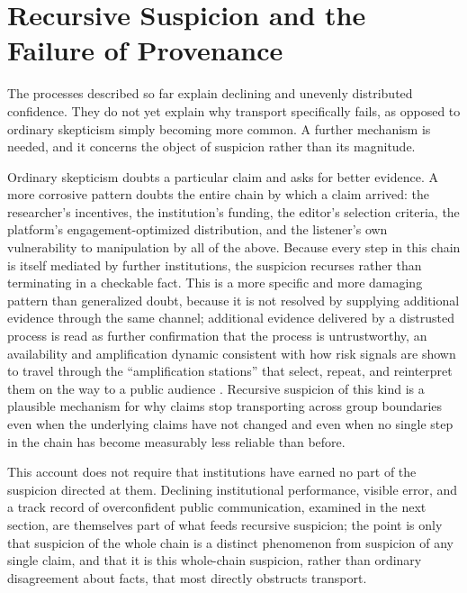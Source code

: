 \documentclass[11pt]{article}
\begin{document}
\section{Recursive Suspicion and the Failure of Provenance}

The processes described so far explain declining and unevenly distributed confidence. They do not yet explain why transport specifically fails, as opposed to ordinary skepticism simply becoming more common. A further mechanism is needed, and it concerns the object of suspicion rather than its magnitude.

Ordinary skepticism doubts a particular claim and asks for better evidence. A more corrosive pattern doubts the entire chain by which a claim arrived: the researcher's incentives, the institution's funding, the editor's selection criteria, the platform's engagement-optimized distribution, and the listener's own vulnerability to manipulation by all of the above. Because every step in this chain is itself mediated by further institutions, the suspicion recurses rather than terminating in a checkable fact. This is a more specific and more damaging pattern than generalized doubt, because it is not resolved by supplying additional evidence through the same channel; additional evidence delivered by a distrusted process is read as further confirmation that the process is untrustworthy, an availability and amplification dynamic consistent with how risk signals are shown to travel through the ``amplification stations'' that select, repeat, and reinterpret them on the way to a public audience \citep{kasperson1988}. Recursive suspicion of this kind is a plausible mechanism for why claims stop transporting across group boundaries even when the underlying claims have not changed and even when no single step in the chain has become measurably less reliable than before.

This account does not require that institutions have earned no part of the suspicion directed at them. Declining institutional performance, visible error, and a track record of overconfident public communication, examined in the next section, are themselves part of what feeds recursive suspicion; the point is only that suspicion of the whole chain is a distinct phenomenon from suspicion of any single claim, and that it is this whole-chain suspicion, rather than ordinary disagreement about facts, that most directly obstructs transport.
\end{document}
